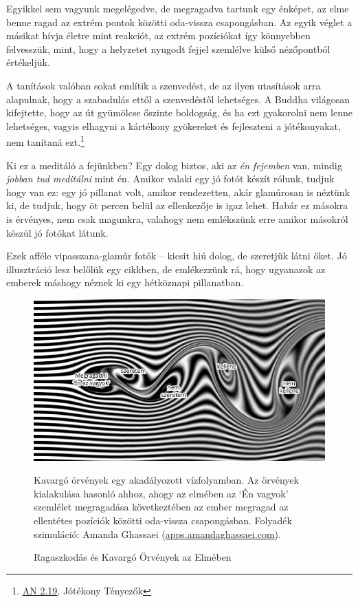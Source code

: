 Egyikkel sem vagyunk megelégedve, de megragadva tartunk egy énképet, az
elme benne ragad az extrém pontok közötti oda-vissza csapongásban. Az
egyik véglet a másikat hívja életre mint reakciót, az extrém pozíciókat
így könnyebben felvesszük, mint, hogy a helyzetet nyugodt fejjel
szemlélve külső nézőpontból értékeljük.

A tanítások valóban sokat említik a szenvedést, de az ilyen utasítások
arra alapulnak, hogy a szabadulás ettől a szenvedéstől lehetséges. A
Buddha világosan kifejtette, hogy az út gyümölcse őszinte boldogság, és
ha ezt gyakorolni nem lenne lehetséges, vagyis elhagyni a kártékony
gyökereket és fejleszteni a jótékonyakat, nem tanítaná ezt.\footnote{\href{https://suttacentral.net/an2.11-20/en/thanissaro}{AN
  2.19}, Jótékony Tényezők}

Ki ez a meditáló a fejünkben? Egy dolog biztos, aki az \emph{én
fejemben} van, mindig \emph{jobban tud meditálni} mint én. Amikor valaki
egy jó fotót készít rólunk, tudjuk hogy van ez: egy jó pillanat volt,
amikor rendezetten, akár glamúrosan is néztünk ki, de tudjuk, hogy öt
percen belül az ellenkezője is igaz lehet. Habár ez másokra is érvényes,
nem csak magunkra, valahogy nem emlékszünk erre amikor másokról készül
jó fotókat látunk.

Ezek afféle vipasszana-glamúr fotók -- kicsit hiú dolog, de szeretjük
látni őket. Jó illusztráció lesz belőlük egy cikkben, de emlékezzünk rá,
hogy ugyanazok az emberek máshogy néznek ki egy hétköznapi pillanatban.

\clearpage

\null\vfill

\begin{figure}[h]
\caption{Ragaszkodás és Kavargó Örvények az Elmében}\label{fig-grasping-turbulence}
\hspace*{-9mm}%
\includegraphics[width=\linewidth+18mm]{./manuscript/tex/diagrams/grasping-turbulence-hu.pdf}

\bigskip

{\small
Kavargó örvények egy akadályozott vízfolyamban.
Az örvények kialakulása hasonló ahhoz, ahogy az elmében az `Én vagyok' szemlélet megragadása következtében
az ember megragad az ellentétes pozíciók közötti oda-vissza csapongásban.
Folyadék szimuláció:
Amanda Ghassaei (\href{http://apps.amandaghassaei.com/VortexShedding/}{apps.amandaghassaei.com}).
\par}
\end{figure}

